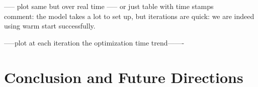 {----- plot same but over real time ----- or just table with time stamps\\
comment: the model takes a lot to set up, but iterations are quick: we are indeed using warm start successfully.



-----plot at each iteration the optimization time trend-------
}















\section{Conclusion and Future Directions}

{\color{violet}


}















